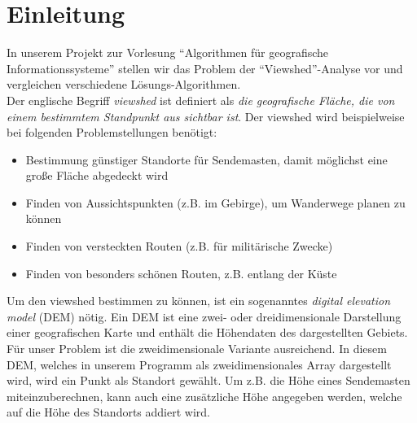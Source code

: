 \section{Einleitung}
In unserem Projekt zur Vorlesung ``Algorithmen für geografische Informationssysteme'' stellen wir das Problem der ``Viewshed''-Analyse vor und 
vergleichen verschiedene Lösungs-Algorithmen. \\ Der englische Begriff \textit{viewshed} ist definiert als \textit{die geografische Fläche, die 
von einem bestimmtem Standpunkt aus sichtbar ist}. Der viewshed wird beispielweise bei folgenden Problemstellungen benötigt:
\begin{itemize}
 \item Bestimmung günstiger Standorte für Sendemasten, damit möglichst eine große Fläche abgedeckt wird
 \item Finden von Aussichtspunkten (z.B. im Gebirge), um Wanderwege planen zu können
 \item Finden von versteckten Routen (z.B. für militärische Zwecke)
 \item Finden von besonders schönen Routen, z.B. entlang der Küste 
\end{itemize}
Um den viewshed bestimmen zu können, ist ein sogenanntes \textit{digital elevation model} (DEM) nötig. Ein DEM ist eine zwei- oder 
dreidimensionale Darstellung einer geografischen Karte und enthält die Höhendaten des dargestellten Gebiets. Für unser Problem ist die 
zweidimensionale Variante ausreichend. In diesem DEM, welches in unserem Programm als zweidimensionales Array dargestellt wird, wird ein Punkt als 
Standort gewählt. Um z.B. die Höhe eines Sendemasten miteinzuberechnen, kann auch eine zusätzliche Höhe angegeben werden, welche auf die Höhe des 
Standorts addiert wird.

\cite{Fisher} \cite{vanKrev}


